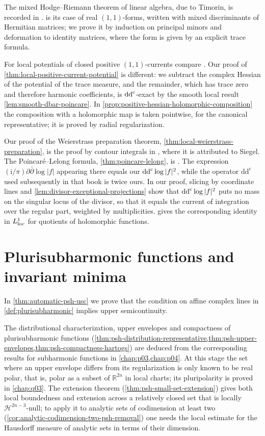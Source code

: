 The mixed Hodge--Riemann theorem of linear algebra, due to Timorin, is recorded in \cite[Proposition 2.1]{DN2005mixedv2}.  is its case of real $(1,1)$-forms, written with mixed discriminants of Hermitian matrices; we prove it by induction on principal minors and deformation to identity matrices, where the form is given by an explicit trace formula.

For local potentials of closed positive $(1,1)$-currents compare \cite[Chapter III, Section 1.18 and (1.19)]{DemBook}. Our proof of \cref{thm:local-positive-current-potential} is different: we subtract the complex Hessian of the potential of the trace measure, and the remainder, which has trace zero and therefore harmonic coefficients, is $\mathrm{dd}^{\mathrm{c}}$-exact by the smooth local result \cref{lem:smooth-dbar-poincare}. In \cref{prop:positive-hessian-holomorphic-composition} the composition with a holomorphic map is taken pointwise, for the canonical representative; it is proved by radial regularization.

Our proof of the Weierstrass preparation theorem, \cref{thm:local-weierstrass-preparation}, is the proof by contour integrals in \cite[Chapter II, Section 2.A, Theorem (2.1)]{DemBook}, where it is attributed to Siegel. The Poincar\'e--Lelong formula, \cref{thm:poincare-lelong}, is \cite[Chapter III, (2.15)]{DemBook}. The expression $(\mathrm{i}/\pi)\partial\bar\partial\log|f|$ appearing there equals our $\mathrm{dd}^{\mathrm{c}}\log|f|^2$, while the operator $\mathrm{dd^c}$ used subsequently in that book is twice ours. In our proof, slicing by coordinate lines and \cref{lem:divisor-exceptional-projections} show that $\mathrm{dd}^{\mathrm{c}}\log|f|^2$ puts no mass on the singular locus of the divisor, so that it equals the current of integration over the regular part, weighted by multiplicities.  gives the corresponding identity in $L^1_{\mathrm{loc}}$ for quotients of holomorphic functions.

\section{Plurisubharmonic functions and invariant minima}
\label{sec:history-plurisubharmonic}
In \cref{thm:automatic-psh-usc} we prove that the condition on affine complex lines in \cref{def:plurisubharmonic} implies upper semicontinuity.

The distributional characterization, upper envelopes and compactness of plurisubharmonic functions (\cref{thm:psh-distribution-representative,thm:psh-upper-envelopes,thm:psh-compactness-hartogs}) are deduced from the corresponding results for subharmonic functions in \cref{chap:p03,chap:p04}. At this stage the set where an upper envelope differs from its regularization is only known to be real polar, that is, polar as a subset of $\mathbb R^{2n}$ in local charts; its pluripolarity is proved in \cref{chap:q03}. The extension theorem (\cref{thm:psh-small-set-extension}) gives both local boundedness and extension across a relatively closed set that is locally $\mathcal H^{2n-3}$-null; to apply it to analytic sets of codimension at least two (\cref{cor:analytic-codimension-two-psh-removal}) one needs the local estimate for the Hausdorff measure of analytic sets in terms of their dimension.

